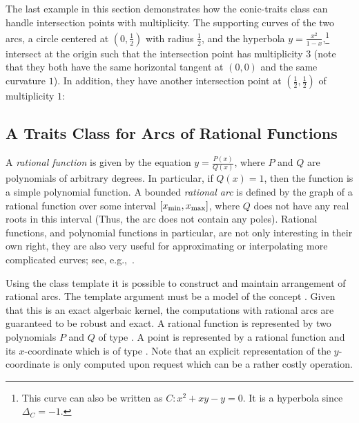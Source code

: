 
The last example in this section demonstrates how the conic-traits
class can handle intersection points with multiplicity. The
supporting curves of the two arcs, a circle centered at
$(0,\frac{1}{2})$ with radius $\frac{1}{2}$, and the hyperbola $y
= \frac{x^2}{1-x}$,\footnote{This curve can also be written as $C:
x^2 + xy - y = 0$. It is a hyperbola since $\Delta_{C} = -1$.}
intersect at the origin such that the intersection point has
multiplicity $3$ (note that they both have the same horizontal
tangent at $(0,0)$ and the same curvature $1$). In addition, they
have another intersection point at $(\frac{1}{2},\frac{1}{2})$ of
multiplicity $1$:


\subsection{A Traits Class for Arcs of Rational Functions\label{arr_ssec:tr_ratfunc}}

A {\em rational function} is given by the equation $y =
\frac{P(x)}{Q(x)}$, where $P$ and $Q$ are polynomials of arbitrary
degrees. In particular, if $Q(x) = 1$, then the function is a
simple polynomial function. A bounded {\em rational arc} is
defined by the graph of a rational function over some interval
$[x_{\rm min}, x_{\rm max}]$, where $Q$ does not have any real
roots in this interval (Thus, the arc does not contain any poles).
Rational functions, and polynomial functions in particular, are
not only interesting in their own right, they are also very useful
for approximating or interpolating more complicated curves; see,
e.g.,~\cite[Chapter~3]{cgal:ptvf-nrcpp-02}.

Using the  class
template it is possible to construct and maintain arrangement of
rational arcs. 
The template argument must be a model of the concept . 
Given that this is an exact algerbaic kernel, the computations with rational 
arcs are guaranteed to be robust and exact. 
A rational function is represented by two polynomials $P$ and $Q$ of type 
. 
A point is represented by a rational function and its $x$-coordinate which is 
of type . 
Note that an explicit representation of the $y$-coordinate is only computed upon 
request which can be a rather costly operation. 

